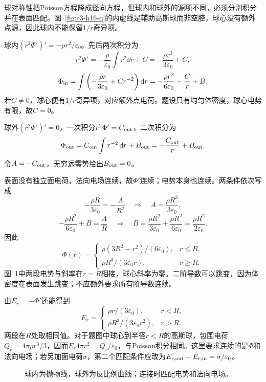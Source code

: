 \begin{solution}
球对称性把Poisson方程降成径向方程，但球内和球外的源项不同，必须分别积分并在表面匹配。图~\ref{fig:c3-h16-q}的内虚线是辅助高斯球而非空腔，球心没有额外点源，因此球内不能保留$1/r$奇异项。


球内$(r^2\Phi')'=-\rho r^2/\varepsilon_0$。先后两次积分为
\[
r^2\Phi'=-\frac{\rho}{\varepsilon_0}\int r^2\dd r+C
=-\frac{\rho r^3}{3\varepsilon_0}+C,
\]
\[
\Phi_{\rm in}=\int\left(-\frac{\rho r}{3\varepsilon_0}+Cr^{-2}\right)\mathop{}\!\mathrm d r
=-\frac{\rho r^2}{6\varepsilon_0}-\frac Cr+B.
\]
若$C\ne0$，球心便有$1/r$奇异项，对应额外点电荷。题设只有均匀体密度，球心电势有限，故$C=0$。

球外$(r^2\Phi')'=0$，一次积分$r^2\Phi'=C_{\rm out}$，二次积分为
\[\Phi_{\rm out}=C_{\rm out}\int r^{-2}\mathop{}\!\mathrm d r+B_{\rm out}
=-\frac{C_{\rm out}}r+B_{\rm out}.\]
令$A=-C_{\rm out}$，无穷远零势给出$B_{\rm out}=0$。

表面没有独立面电荷，法向电场连续，故$\Phi'$连续；电势本身也连续。两条件依次写成
\[
-\frac{\rho R}{3\varepsilon_0}=-\frac{A}{R^2}
\quad\Longrightarrow\quad A=\frac{\rho R^3}{3\varepsilon_0},
\]
\[
-\frac{\rho R^2}{6\varepsilon_0}+B=\frac AR
\quad\Longrightarrow\quad B=\frac{\rho R^2}{3\varepsilon_0}
+\frac{\rho R^2}{6\varepsilon_0}=\frac{\rho R^2}{2\varepsilon_0}.
\]
因此
\[\boxed{\Phi(r)=\begin{cases}\rho(3R^2-r^2)/(6\varepsilon_0),&r\le R,\\
\rho R^3/(3\varepsilon_0r),&r\ge R.\end{cases}}\]
图~\ref{fig:c3-h16-s}中两段电势与斜率在$r=R$相接，球心斜率为零。二阶导数可以跳变，因为体密度在表面发生跳变；不应额外要求所有阶导数连续。


由$E_r=-\Phi'$还能得到
\[E_r=\begin{cases}\rho r/(3\varepsilon_0),&r<R,\\
\rho R^3/(3\varepsilon_0r^2),&r>R.\end{cases}\]
两段在$R$处取相同值。对于题图中球心到半径$r<R$的高斯球，包围电荷$Q_r=4\pi\rho r^3/3$，因而$E_r4\pi r^2=Q_r/\varepsilon_0$，与Poisson积分相同。这里要求连续的是$\Phi$和法向电场；若另加面电荷$\sigma$，第二个匹配条件应改为$E_{r,\rm out}-E_{r,\rm in}=\sigma/\varepsilon_0$。

\begin{figure}[H]\centering
{}
\caption{球内为抛物线，球外为反比例曲线；连接时匹配电势和法向电场。}\label{fig:c3-h16-s}
\end{figure}
\end{solution}

